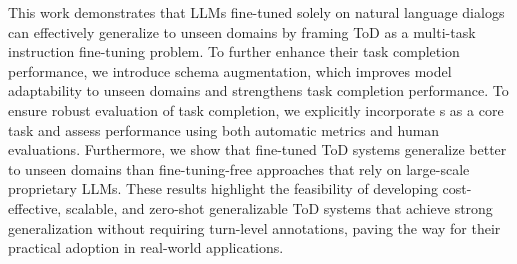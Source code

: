 This work demonstrates that LLMs fine-tuned solely on natural language dialogs can effectively generalize to unseen domains by framing ToD as a multi-task instruction fine-tuning problem.
To further enhance their {\ood} task completion performance, we introduce schema augmentation, which improves model adaptability to unseen domains and strengthens task completion performance. To ensure robust evaluation of task completion, we explicitly incorporate {\apicall}s as a core task and assess performance using both automatic metrics and human evaluations.
Furthermore, we show that fine-tuned ToD systems generalize better to unseen domains than fine-tuning-free approaches that rely on large-scale proprietary LLMs.
These results highlight the feasibility of developing cost-effective, scalable, and zero-shot generalizable ToD systems that achieve strong {\ood} generalization without requiring turn-level annotations, paving the way for their practical adoption in real-world applications.








